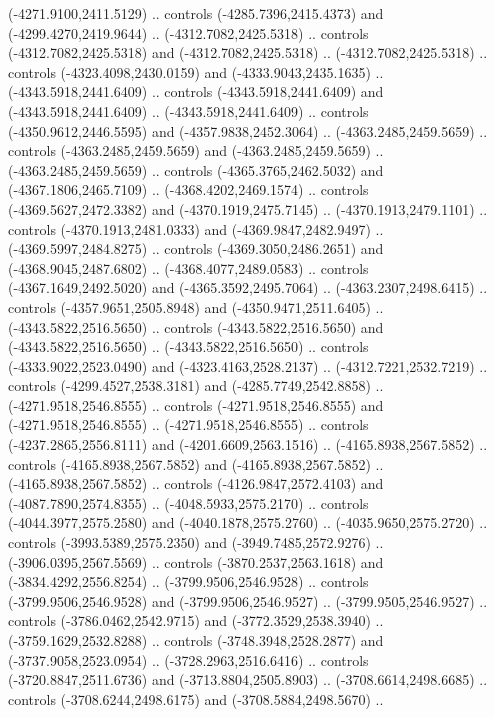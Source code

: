 \begin{scope}[shift={(430.80877,-416.69739)}]
\begin{scope}[shift={(4537.8125,-1856.4436)}]
\begin{scope}[shift={(-148.39113,-28.14259)}]
        (-4271.9100,2411.5129) .. controls (-4285.7396,2415.4373) and
        (-4299.4270,2419.9644) .. (-4312.7082,2425.5318) .. controls
        (-4312.7082,2425.5318) and (-4312.7082,2425.5318) .. (-4312.7082,2425.5318) ..
        controls (-4323.4098,2430.0159) and (-4333.9043,2435.1635) ..
        (-4343.5918,2441.6409) .. controls (-4343.5918,2441.6409) and
        (-4343.5918,2441.6409) .. (-4343.5918,2441.6409) .. controls
        (-4350.9612,2446.5595) and (-4357.9838,2452.3064) .. (-4363.2485,2459.5659) ..
        controls (-4363.2485,2459.5659) and (-4363.2485,2459.5659) ..
        (-4363.2485,2459.5659) .. controls (-4365.3765,2462.5032) and
        (-4367.1806,2465.7109) .. (-4368.4202,2469.1574) .. controls
        (-4369.5627,2472.3382) and (-4370.1919,2475.7145) .. (-4370.1913,2479.1101) ..
        controls (-4370.1913,2481.0333) and (-4369.9847,2482.9497) ..
        (-4369.5997,2484.8275) .. controls (-4369.3050,2486.2651) and
        (-4368.9045,2487.6802) .. (-4368.4077,2489.0583) .. controls
        (-4367.1649,2492.5020) and (-4365.3592,2495.7064) .. (-4363.2307,2498.6415) ..
        controls (-4357.9651,2505.8948) and (-4350.9471,2511.6405) ..
        (-4343.5822,2516.5650) .. controls (-4343.5822,2516.5650) and
        (-4343.5822,2516.5650) .. (-4343.5822,2516.5650) .. controls
        (-4333.9022,2523.0490) and (-4323.4163,2528.2137) .. (-4312.7221,2532.7219) ..
        controls (-4299.4527,2538.3181) and (-4285.7749,2542.8858) ..
        (-4271.9518,2546.8555) .. controls (-4271.9518,2546.8555) and
        (-4271.9518,2546.8555) .. (-4271.9518,2546.8555) .. controls
        (-4237.2865,2556.8111) and (-4201.6609,2563.1516) .. (-4165.8938,2567.5852) ..
        controls (-4165.8938,2567.5852) and (-4165.8938,2567.5852) ..
        (-4165.8938,2567.5852) .. controls (-4126.9847,2572.4103) and
        (-4087.7890,2574.8355) .. (-4048.5933,2575.2170) .. controls
        (-4044.3977,2575.2580) and (-4040.1878,2575.2760) .. (-4035.9650,2575.2720) ..
        controls (-3993.5389,2575.2350) and (-3949.7485,2572.9276) ..
        (-3906.0395,2567.5569) .. controls (-3870.2537,2563.1618) and
        (-3834.4292,2556.8254) .. (-3799.9506,2546.9528) .. controls
        (-3799.9506,2546.9528) and (-3799.9506,2546.9527) .. (-3799.9505,2546.9527) ..
        controls (-3786.0462,2542.9715) and (-3772.3529,2538.3940) ..
        (-3759.1629,2532.8288) .. controls (-3748.3948,2528.2877) and
        (-3737.9058,2523.0954) .. (-3728.2963,2516.6416) .. controls
        (-3720.8847,2511.6736) and (-3713.8804,2505.8903) .. (-3708.6614,2498.6685) ..
        controls (-3708.6244,2498.6175) and (-3708.5884,2498.5670) ..

\end{scope}
\end{scope}
\end{scope}
